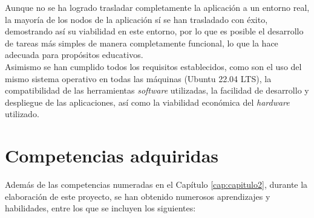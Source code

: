 Aunque no se ha logrado trasladar completamente la aplicación a un entorno real,
la mayoría de los nodos de la aplicación sí se han trasladado con éxito,
demostrando así su viabilidad en este entorno, por lo que es posible el
desarrollo de tareas más simples de manera completamente funcional, lo que la
hace adecuada para propósitos educativos.
\\

Asimismo se han cumplido todos los requisitos establecidos, como son el uso del
mismo sistema operativo en todas las máquinas (Ubuntu 22.04 LTS), la
compatibilidad de las herramientas \textit{software} utilizadas, la facilidad de
desarrollo y despliegue de las aplicaciones, así como la viabilidad económica
del \textit{hardware} utilizado.
\\



\section{Competencias adquiridas}
\label{sec:competencias_adquiridas}

Además de las competencias numeradas en el Capítulo \ref{cap:capitulo2}, durante
la elaboración de este proyecto, se han obtenido numerosos aprendizajes y
habilidades, entre los que se incluyen los siguientes:

